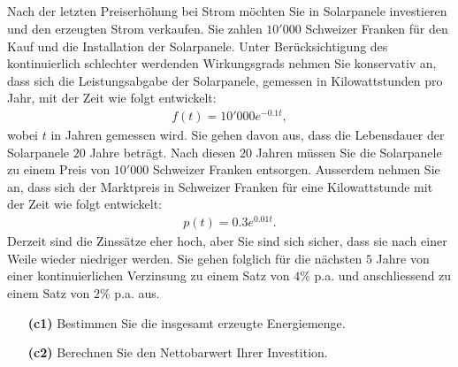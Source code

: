 \subsection*{}
Nach der letzten Preiserhöhung bei Strom möchten Sie in Solarpanele investieren und den erzeugten Strom verkaufen. 
Sie zahlen $10'000$ Schweizer Franken für den Kauf und die
Installation der Solarpanele.
Unter Berücksichtigung des kontinuierlich schlechter werdenden Wirkungsgrads nehmen Sie konservativ an, dass sich die Leistungsabgabe der Solarpanele, gemessen in Kilowattstunden pro Jahr, mit der Zeit wie folgt entwickelt:
\begin{align*}
	f(t) = 10'000 e^{-0.1 t},
\end{align*}
wobei $t$ in Jahren gemessen wird.
Sie gehen davon aus, dass die Lebensdauer der Solarpanele $20$ Jahre beträgt. Nach diesen $20$ Jahren müssen Sie die Solarpanele zu einem Preis von $10'000$ Schweizer Franken entsorgen. Ausserdem nehmen Sie an, dass sich der Marktpreis in
Schweizer Franken für eine Kilowattstunde mit der Zeit wie folgt entwickelt:
\begin{align*}
	p(t)
	=
	0.3 e^{0.01t}.
\end{align*}
Derzeit sind die Zinssätze eher hoch, aber Sie sind sich sicher, dass sie nach einer Weile wieder niedriger werden. Sie gehen folglich für die nächsten $5$ Jahre von einer kontinuierlichen
Verzinsung zu einem Satz von $4 \%$ p.a. und anschliessend zu einem Satz von $2\%$ p.a. aus.

\begin{enumerate}
	\item[\textbf{(c1)}] 
	Bestimmen Sie die insgesamt erzeugte Energiemenge.
	\item[\textbf{(c2)}]
	Berechnen Sie den Nettobarwert Ihrer Investition.
\end{enumerate}

\newpage


